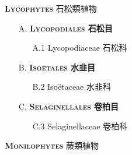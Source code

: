 \noindent \normalsize\textsc{\textbf{Lycophytes} 石松類植物}\selectfont \\
\footnotesize\selectfont
\begin{enumerate}
  \item[A. ] \textbf{\textsc{Lycopodiales} 石松目} 
    \begin{enumerate}
      \item[A.1] Lycopodiaceae 石松科   
        
    \end{enumerate}
  \item[B. ] \textbf{\textsc{Isoëtales} 水韭目} 
    \begin{enumerate}
      \item[B.2] Isoëtaceae 水韭科   
        
    \end{enumerate}
  \item[C. ] \textbf{\textsc{Selaginellales} 卷柏目} 
    \begin{enumerate}
      \item[C.3] Selaginellaceae 卷柏科   
        
    \end{enumerate}
\end{enumerate}
\vspace{2ex} 
\noindent \normalsize\textsc{\textbf{Monilophytes} 蕨類植物}\selectfont \\
\footnotesize\selectfont
